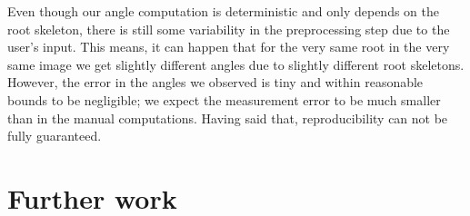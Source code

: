 Even though our angle computation is deterministic %
and only depends on the root skeleton, there is still some variability in the preprocessing step due to the user's input. This means, it can happen that for the very same root in the very same image we get slightly different angles due to slightly different root skeletons. %
However, the error in the angles we observed is tiny and within reasonable bounds to be negligible; we expect the measurement error to be much smaller than in the manual computations. Having said that, reproducibility can not be fully guaranteed. %


%
%








 
\section{Further work}

